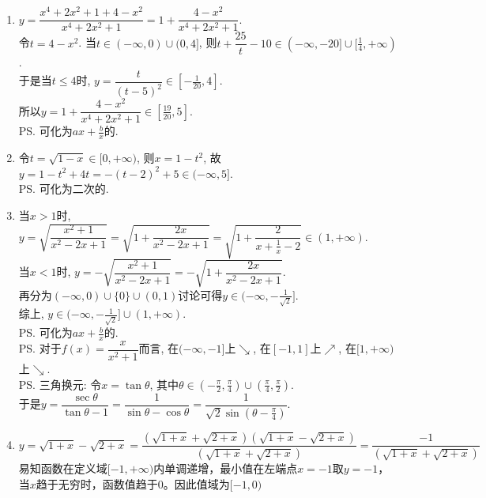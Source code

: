 \begin{enumerate}
\begin{jieda}
\begin{enumerate}
\item $y=\dfrac{x^4+2x^2+1+4-x^2}{x^4+2x^2+1}=1+\dfrac{4-x^2}{x^4+2x^2+1}$. \\
令$t=4-x^2$. 当$t\in(-\infty,0)\cup(0,4]$, 则$t+\dfrac{25}{t}-10\in(-\infty,-20]\cup[\frac{1}{4},+\infty)$. \\
于是当$t\leq 4$时, $y=\dfrac{t}{(t-5)^2}\in[-\frac{1}{20},4]$. \\
所以$y=1+\dfrac{4-x^2}{x^4+2x^2+1}\in[\frac{19}{20},5]$. \\
\ps 可化为$ax+\frac{b}{x}$的. 

\item 令$t=\sqrt{1-x}\in[0,+\infty)$, 则$x=1-t^2$, 故$y=1-t^2+4t=-(t-2)^2+5\in(-\infty,5]$. \\
\ps 可化为二次的. 

\item 当$x>1$时, $y=\sqrt{\dfrac{x^2+1}{x^2-2x+1}}=\sqrt{1+\dfrac{2x}{x^2-2x+1}}=\sqrt{1+\dfrac{2}{x+\frac{1}{x}-2}}\in(1,+\infty)$. \\
当$x<1$时, $y=-\sqrt{\dfrac{x^2+1}{x^2-2x+1}}=-\sqrt{1+\dfrac{2x}{x^2-2x+1}}$. \\
再分为$(-\infty,0)\cup\{0\}\cup(0,1)$讨论可得$y\in(-\infty,-\frac{1}{\sqrt{2}}]$. \\
综上, $y\in(-\infty,-\frac{1}{\sqrt{2}}]\cup(1,+\infty)$. \\
\ps 可化为$ax+\frac{b}{x}$的. \\
\ps 对于$f(x)=\dfrac{x}{x^2+1}$而言, 在$(-\infty,-1]$上$\searrow$, 在$[-1,1]$上$\nearrow$, 在$[1,+\infty)$上$\searrow$. \\
\ps 三角换元: 令$x=\tan\theta$, 其中$\theta\in(-\frac{\pi}{2},\frac{\pi}{4})\cup(\frac{\pi}{4},\frac{\pi}{2})$. \\
于是$y=\dfrac{\sec\theta}{\tan\theta-1}=\dfrac{1}{\sin\theta-\cos\theta}=\dfrac{1}{\sqrt{2}\sin(\theta-\frac{\pi}{4})}$. %
\item $y = \sqrt{1+x} - \sqrt{2+x} = \dfrac{(\sqrt{1+x} + \sqrt{2+x})(\sqrt{1+x} - \sqrt{2+x})}{(\sqrt{1+x} + \sqrt{2+x})} = \dfrac{-1}{(\sqrt{1+x} + \sqrt{2+x})}$ \\
易知函数在定义域$[-1, +\infty)$内单调递增，最小值在左端点$x = -1$取$y = -1$，当$x$趋于无穷时，函数值趋于0。因此值域为$[-1, 0)$
\end{enumerate}
\end{jieda}
\end{enumerate}